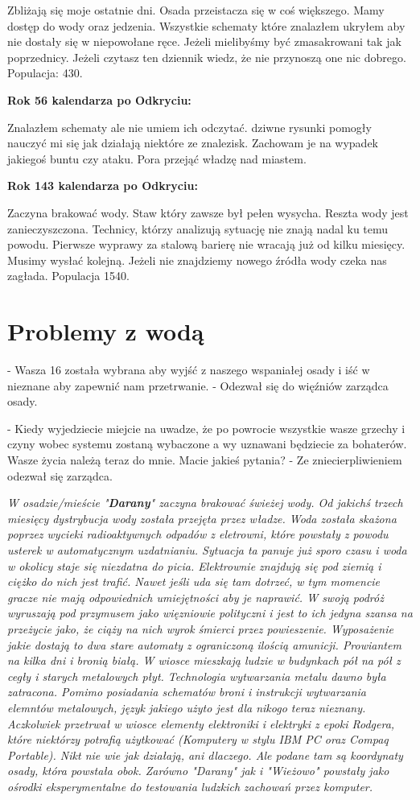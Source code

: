 \documentclass{article}
\newcommand{\textbb}[1]{
        \smallskip
        \textbf{{#1}}
        \smallskip
    }
\begin{document}
    Zbliżają się moje ostatnie dni. Osada przeistacza się w coś większego. Mamy dostęp do wody oraz jedzenia. Wszystkie schematy które znalazłem ukryłem aby nie dostały się w niepowołane ręce. Jeżeli mielibyśmy być zmasakrowani tak jak poprzednicy. Jeżeli czytasz ten dziennik wiedz, że nie przynoszą one nic dobrego. Populacja: 430.

    \textbb{Rok 56 kalendarza po Odkryciu:}

    Znalazłem schematy ale nie umiem ich odczytać. dziwne rysunki pomogły nauczyć mi się jak działają niektóre ze znalezisk. Zachowam je na wypadek jakiegoś buntu czy ataku. Pora przejąć władzę nad miastem.

    \textbb{Rok 143 kalendarza po Odkryciu:}

    Zaczyna brakować wody. Staw który zawsze był pełen wysycha. Reszta wody jest zanieczyszczona. Technicy, którzy analizują sytuację nie znają nadal ku temu powodu. Pierwsze wyprawy za stalową barierę nie wracają już od kilku miesięcy. Musimy wysłać kolejną. Jeżeli nie znajdziemy nowego źródła wody czeka nas zagłada. Populacja 1540.

    \section{Problemy z wodą}
    - Wasza 16 została wybrana aby wyjść z naszego wspaniałej osady i iść w nieznane aby zapewnić nam przetrwanie. - Odezwał się do więźniów zarządca osady.

    - Kiedy wyjedziecie miejcie na uwadze, że po powrocie wszystkie wasze grzechy i czyny wobec systemu zostaną wybaczone a wy uznawani będziecie za bohaterów. Wasze życia należą teraz do mnie. Macie jakieś pytania? - Ze zniecierpliwieniem odezwał się zarządca.\bigskip

    \slshape
    W osadzie/mieście "\textbf{Darany}" zaczyna brakować świeżej wody. Od jakichś trzech miesięcy dystrybucja wody została przejęta przez władze. Woda została skażona poprzez wycieki radioaktywnych odpadów z eletrowni, które powstały z powodu usterek w automatycznym uzdatnianiu. Sytuacja ta panuje już sporo czasu i woda w okolicy staje się niezdatna do picia. Elektrownie znajdują się pod ziemią i ciężko do nich jest trafić. Nawet jeśli uda się tam dotrzeć, w tym momencie gracze nie mają odpowiednich umiejętności aby je naprawić.
    W swoją podróż wyruszają pod przymusem jako więzniowie polityczni i jest to ich jedyna szansa na przeżycie jako, że ciąży na nich wyrok śmierci przez powieszenie. Wyposażenie jakie dostają to dwa stare automaty z ograniczoną ilością amunicji. Prowiantem na kilka dni i bronią białą. W wiosce mieszkają ludzie w budynkach pół na pół z cegły i starych metalowych płyt. Technologia wytwarzania metalu dawno była zatracona. Pomimo posiadania schematów broni i instrukcji wytwarzania elemntów metalowych, język jakiego użyto jest dla nikogo teraz nieznany. Aczkolwiek przetrwał w wiosce elementy elektroniki i elektryki z epoki Rodgera, które niektórzy potrafią użytkować (Komputery w stylu IBM PC oraz Compaq Portable). Nikt nie wie jak działają, ani dlaczego. Ale podane tam są koordynaty osady, która powstała obok. Zarówno "Darany" jak i "Wieżowo" powstały jako ośrodki eksperymentalne do testowania ludzkich zachowań przez komputer.
\end{document}

